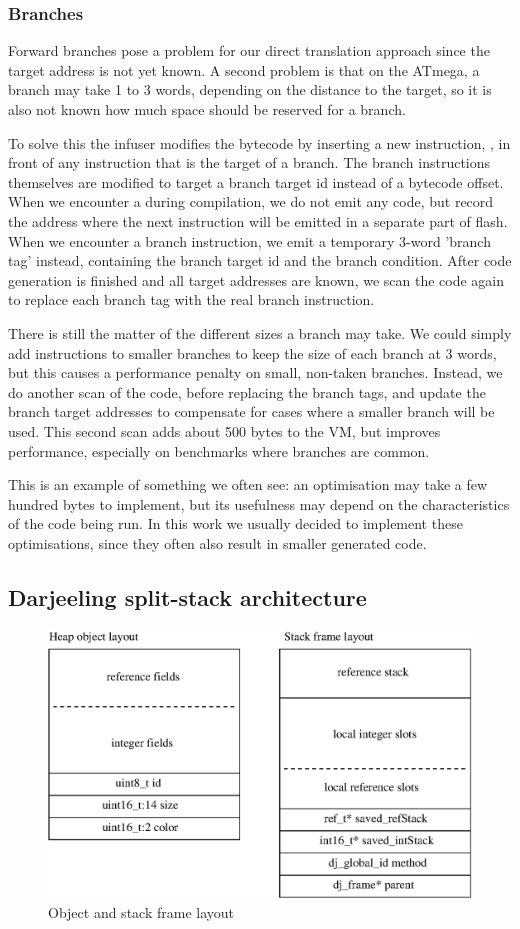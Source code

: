 \subsubsection{Branches}
Forward branches pose a problem for our direct translation approach since the target address is not yet known. A second problem is that on the ATmega, a branch may take 1 to 3 words, depending on the distance to the target, so it is also not known how much space should be reserved for a branch.

To solve this the infuser modifies the bytecode by inserting a new instruction, , in front of any instruction that is the target of a branch. The branch instructions themselves are modified to target a branch target id instead of a bytecode offset. When we encounter a  during compilation, we do not emit any code, but record the address where the next instruction will be emitted in a separate part of flash. When we encounter a branch instruction, we emit a temporary 3-word 'branch tag' instead, containing the branch target id and the branch condition. After code generation is finished and all target addresses are known, we scan the code again to replace each branch tag with the real branch instruction.

There is still the matter of the different sizes a branch may take. We could simply add  instructions to smaller branches to keep the size of each branch at 3 words, but this causes a performance penalty on small, non-taken branches. Instead, we do another scan of the code, before replacing the branch tags, and update the branch target addresses to compensate for cases where a smaller branch will be used. This second scan adds about 500 bytes to the VM, but improves performance, especially on benchmarks where branches are common.

This is an example of something we often see: an optimisation may take a few hundred bytes to implement, but its usefulness may depend on the characteristics of the code being run. In this work we usually decided to implement these optimisations, since they often also result in smaller generated code.

\subsection{Darjeeling split-stack architecture}
\begin{figure}[]
  \includegraphics[width=0.5\linewidth]{object-and-stack-frame-layout.eps}
  \caption{Object and stack frame layout}
  \label{fig-object-and-stack-frame-layout}
\end{figure}

